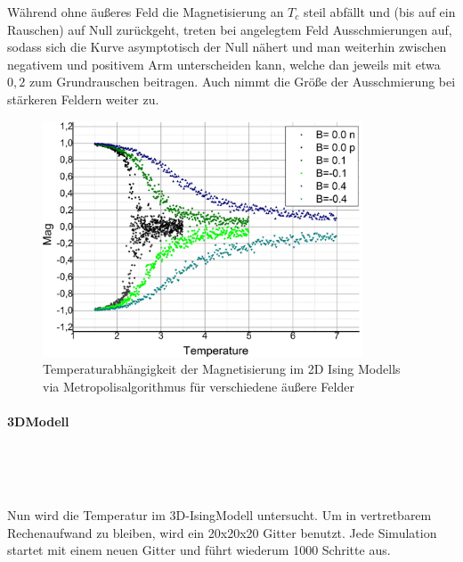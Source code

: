 Während ohne äußeres Feld die Magnetisierung an $T_{c}$ steil abfällt und (bis auf ein Rauschen) auf Null zurückgeht, treten bei angelegtem Feld Ausschmierungen auf, sodass sich die Kurve asymptotisch der Null nähert und man weiterhin zwischen negativem und positivem Arm unterscheiden kann, welche dan jeweils mit etwa $0,2$ zum Grundrauschen beitragen. Auch nimmt die Größe der Ausschmierung bei stärkeren Feldern weiter zu.
\begin{figure}[H]
	\centering
	\includegraphics[width=0.85\textwidth]{../Graph_Export/MP2D/m(T)_MP2D_50_Plot.jpg}	
	\caption{Temperaturabhängigkeit der Magnetisierung im 2D Ising Modells via Metropolisalgorithmus für verschiedene äußere Felder}
	\label{mp2db}
\end{figure}


\paragraph*{3DModell}

\

\

Nun wird die Temperatur im 3D-IsingModell untersucht. Um in vertretbarem Rechenaufwand zu bleiben, wird ein 20x20x20 Gitter benutzt. Jede Simulation startet mit einem neuen Gitter und führt wiederum 1000 Schritte aus.


